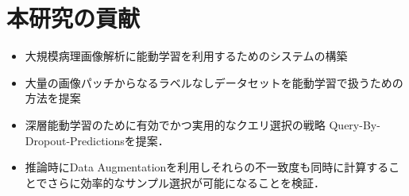 \section{本研究の貢献}
\begin{itemize}
    \item 大規模病理画像解析に能動学習を利用するためのシステムの構築
    \item 大量の画像パッチからなるラベルなしデータセットを能動学習で扱うための方法を提案
    \item 深層能動学習のために有効でかつ実用的なクエリ選択の戦略 Query-By-Dropout-Predictionsを提案．
    \item 推論時にData Augmentationを利用しそれらの不一致度も同時に計算することでさらに効率的なサンプル選択が可能になることを検証．
\end{itemize}
